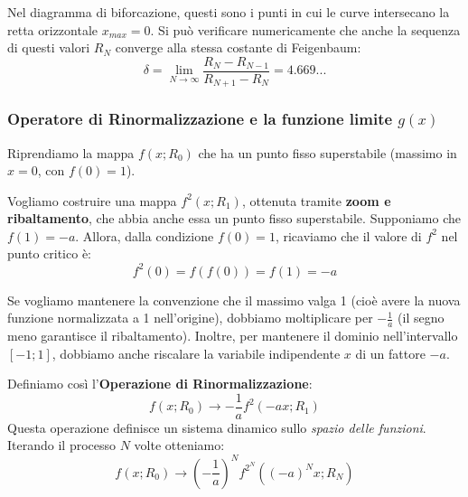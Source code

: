 \documentclass[openany]{book}
\theoremstyle{definition}
\theoremstyle{remark}
\begin{document}
Nel diagramma di biforcazione, questi sono i punti in cui le curve intersecano la retta orizzontale $x_{max} = 0$. Si può verificare numericamente che anche la sequenza di questi valori $R_N$ converge alla stessa costante di Feigenbaum:
\begin{equation}
    \delta = \lim_{N \to \infty} \frac{R_N - R_{N-1}}{R_{N+1} - R_N} = 4.669...
\end{equation}

\subsubsection*{Operatore di Rinormalizzazione e la funzione limite $g(x)$}
Riprendiamo la mappa $f(x; R_0)$ che ha un punto fisso superstabile (massimo in $x=0$, con $f(0)=1$).

\begin{center}
\end{center}

Vogliamo costruire una mappa $f^2(x; R_1)$, ottenuta tramite \textbf{zoom e ribaltamento}, che abbia anche essa un punto fisso superstabile. 
Supponiamo che $f(1) = -a$. Allora, dalla condizione $f(0) = 1$, ricaviamo che il valore di $f^2$ nel punto critico è:
\begin{equation}
    f^2(0) = f(f(0)) = f(1) = -a
\end{equation}

Se vogliamo mantenere la convenzione che il massimo valga 1 (cioè avere la nuova funzione normalizzata a 1 nell'origine), dobbiamo moltiplicare per $-\frac{1}{a}$ (il segno meno garantisce il ribaltamento). Inoltre, per mantenere il dominio nell'intervallo $[-1; 1]$, dobbiamo anche riscalare la variabile indipendente $x$ di un fattore $-a$.

Definiamo così l'\textbf{Operazione di Rinormalizzazione}:
\begin{equation}
    f(x; R_0) \longrightarrow -\frac{1}{a} f^2(-ax; R_1)
\end{equation}
Questa operazione definisce un sistema dinamico sullo \emph{spazio delle funzioni}. Iterando il processo $N$ volte otteniamo:
\begin{equation}
    f(x; R_0) \longrightarrow \left(-\frac{1}{a}\right)^N f^{2^N}((-a)^N x; R_N)
\end{equation}
\end{document}
